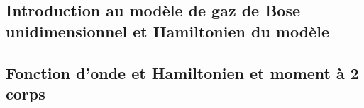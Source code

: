 \subsection{Introduction au modèle de gaz de Bose unidimensionnel et Hamiltonien du modèle}
%




%
%


%


%

%
%
%


 
%
%

\subsection{Fonction d’onde et Hamiltonien et moment à 2 corps}










%



%

